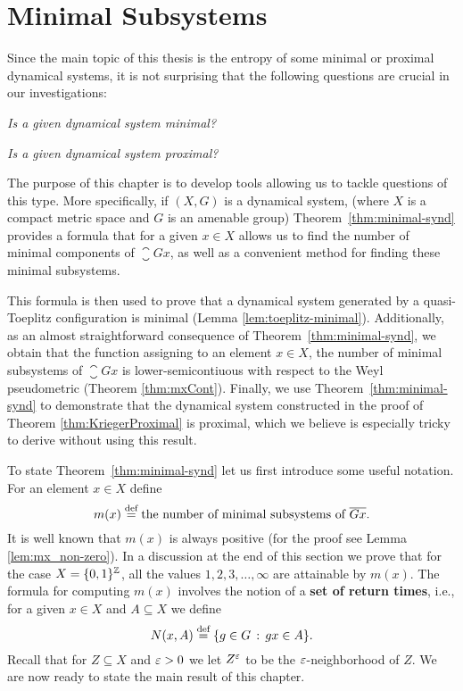 \chapter{Minimal Subsystems}\label{chapter:minimal}
Since the main topic of this thesis is the entropy of some minimal or proximal dynamical systems, it is not surprising that the following questions are crucial in our investigations:
\begin{center}
{\it Is a given dynamical system minimal?}

\vspace{2.5mm}

{\it Is a given dynamical system proximal?}
\end{center}

The purpose of this chapter is to develop tools allowing us to tackle questions of this type.
%
More specifically, if $(X,G)$ is a dynamical system, (where $X$ is a compact metric space and $G$ is an amenable group) Theorem~\ref{thm:minimal-synd} provides a formula that for a given $x\in X$ allows us to find the number of minimal components of $\closure{Gx}$, as well as a convenient method for finding these minimal subsystems.

This formula is then used to prove that a dynamical system generated by a quasi-Toeplitz configuration is minimal (Lemma \ref{lem:toeplitz-minimal}). 
%
Additionally, as an almost straightforward consequence of Theorem~\ref{thm:minimal-synd}, we obtain that the function assigning to an element $x\in X$, the number of minimal subsystems of $\closure{Gx}$ is lower-semicontiuous with respect to the Weyl pseudometric (Theorem \ref{thm:mxCont}). 
%
Finally, we use Theorem~\ref{thm:minimal-synd} to demonstrate that the dynamical system constructed in the proof of Theorem \ref{thm:KriegerProximal} is proximal, which we believe is especially tricky to derive without using this result.

To state Theorem~\ref{thm:minimal-synd} let us first introduce some useful notation.
%
For an element $x\in X$ define
\[
m(x) \stackrel{\textup{def}}{=}  \mbox{the number of minimal subsystems of $\overline{Gx}$.} 
\]
It is well known that $m(x)$ is always positive (for the proof see Lemma \ref{lem:mx_non-zero}). 
In a discussion at the end of this section we prove that for the case $X=\{0,1\}^{\mathbb{Z}}$, all the values $1,2,3, \ldots, \infty$ are attainable by $m(x)$. 
%
The formula for computing $m(x)$ involves the notion of a {\bf set of return times}, i.e., for a given $x\in X$ and $A\subseteq X$ we define
\[
N(x,A)\stackrel{\textup{def}}{=} \{g\in G\,:\,gx\in A\}.
\]
Recall that for $Z\subseteq X$ and $\varepsilon>0$ we let $Z^\varepsilon$ to be the $\varepsilon$-neighborhood  of $Z$.
We are now ready to state the main result of this chapter.

